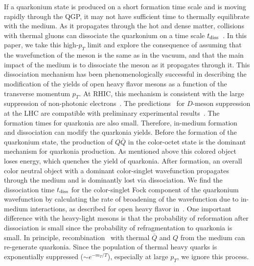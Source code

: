 \documentclass[article,showpacs,preprintnumbers,amsmath,amssymb]{revtex4}
\newcommand{\barQ}{{\bar{Q}}}
\newcommand{\rd}{{\rm diss}}
\begin{document}
If a quarkonium state is produced on a short formation time scale and is moving 
rapidly through the QGP, it  may not have sufficient time to thermally equilibrate with 
the medium.  As it propagates through the hot and dense matter, collisions with
thermal gluons can dissociate the quarkonium on a time scale
$t_\rd$~\cite{hep-ph/0611109,Sharma:2009hn,Dominguez:2008be,Dominguez:2008aa}.
In this paper, we take this high-$p_T$ limit and explore the consequence of
assuming  that  the wavefunction of the meson is the same as in the vacuum, and
that the main impact of the medium is to dissociate the meson as it propagates
through it.  This dissociation mechanism has been phenomenologically successful
in describing the modification of the yields of open heavy flavor mesons as a
function of the transverse momentum $p_T$. At RHIC, this mechanism is consistent with the 
large suppression of non-photonic electrons~\cite{Adare:2006nq,Abelev:2006db,Knospe:2012qf}.  
The predictions~\cite{Sharma:2009hn} for $D$-meson suppression at the LHC are
compatible with preliminary experimental results~\cite{Dainese:2011vb}. The
formation times for quarkonia are also small. Therefore, in-medium formation and
dissociation can modify the quarkonia yields. Before the formation of the
quarkonium state, the production of $Q\bar{Q}$ in the color-octet state is the
dominant mechanism for quarkonia production. As mentioned above this colored object loses
energy, which quenches the yield of quarkonia. After formation, an overall
color neutral object with a dominant color-singlet wavefunction propagates
through the medium and is dominantly lost via dissociation. We find the
dissociation time $t_\rd$ for the color-singlet Fock component of the
quarkonium wavefunction by calculating the rate of broadening of the
wavefunction due to in-medium interactions, as described for open heavy flavor
in~\cite{hep-ph/0611109}. One important difference with the heavy-light mesons
is that the probability of reformation after dissociation is small since the
probability of refragmentation to quarkonia is small. In principle,
recombination~\cite{Bass:2006vu} with thermal $\barQ$ and $Q$ from the medium
can re-generate quarkonia. Since the population of thermal heavy quarks is
exponentially suppressed ($\sim e^{-m_T/T}$), especially at large $p_T$, we
ignore this process.
\end{document}
